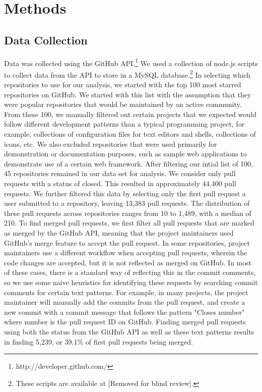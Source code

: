 \documentclass{sigchi}
\begin{document}
\section{Methods} \label{chap:methods}

\subsection{Data Collection} \label{sec:datacollection}

Data was collected using the GitHub API.\footnote{http://developer.github.com/}
We used a collection of node.js scripts to collect data from the API to store in
a MySQL database.\footnote{These scripts are available at [Removed for blind
review].} In selecting which repositories to use for our analysis, we started
with the top 100 most starred repositories on GitHub. We started with this list
with the assumption that they were popular repositories that would be maintained
by an active community. From these 100, we manually filtered out certain
projects that we expected would follow different development patterns than a
typical programming project, for example, collections of configuration files for
text editors and shells, collections of icons, etc. We also excluded
repositories that were used primarily for demonstration or documentation
purposes, such as sample web applications to demonstrate use of a certain web
framework. After filtering our intial list of 100, 45 repositories remained in
our data set for analysis. We consider only pull requests with a status of
closed. This resulted in approximately 44,400 pull requests. We further filtered
this data by selecting only the first pull request a user submitted to a
repository, leaving 13,383 pull requests. The distribution of these pull
requests across repositories ranges from 10 to 1,489, with a median of 210. To
find merged pull requests, we first filter all pull requests that are marked as
merged by the GitHub API, meaning that the project maintainers used GitHub's
merge feature to accept the pull request. In some repositories, project
maintainers use a different workflow when accepting pull requests, wherein the
code changes are accepted, but it is not reflected as merged on GitHub. In most
of these cases, there is a standard way of reflecting this in the commit
comments, so we use some naive heuristics for identifying these requests by
searching commit comments for certain text patterns. For example, in many
projects, the project maintainer will manually add the commits from the pull
request, and create a new commit with a commit message that follows the pattern
"Closes {number}" where {number} is the pull request ID on GitHub. Finding
merged pull requests using both the status from the GitHub API as well as these
text patterns results in finding 5,239, or 39.1\% of first pull requests being
merged.
\end{document}
